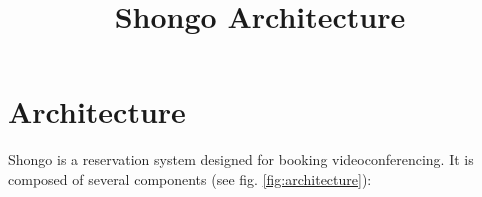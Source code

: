 
\usepackage{titlesec}

\titleformat{\chapter}[display]
    {\normalfont\huge\bfseries}{\chaptertitlename\ \thechapter}{20pt}{\Huge}
\titlespacing*{\chapter}{0pt}{0pt}{30pt}
\addtolength{\textheight}{2cm}
\setlength{\hoffset}{-20pt}
\addtolength{\textwidth}{40pt}



\title{Shongo Architecture}
\maketitle
\tableofcontents





\chapter{Architecture}

Shongo is a reservation system designed for booking videoconferencing. It is composed of several components (see fig. \ref{fig:architecture}):

